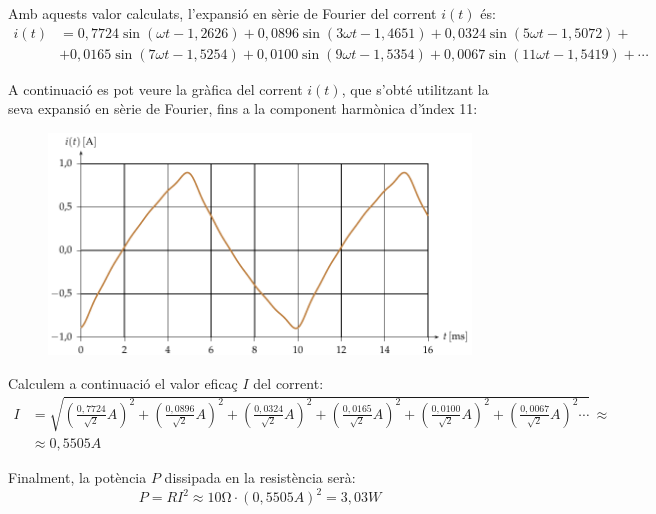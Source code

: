 \begin{exemple}
Amb aquests valor calculats, l'expansi\'{o} en s\`{e}rie de Fourier del
corrent $i(t)$ \'{e}s:
\[\begin{split}
     i(t) &=  0{,}7724 \sin(\omega t - 1{,}2626) +  0{,}0896 \sin(3 \omega t -
     1{,}4651) + 0{,}0324 \sin(5 \omega t - 1{,}5072) +{}\\
     &+ 0{,}0165 \sin(7 \omega t - 1{,}5254) + 0{,}0100 \sin(9 \omega t - 1{,}5354)
     +0{,}0067 \sin(11 \omega t - 1{,}5419) +\cdots
\end{split}\]

A continuaci\'{o} es pot veure la gr\`{a}fica del corrent $i(t)$, que s'obt\'{e}
utilitzant la seva expansi\'{o} en s\`{e}rie de Fourier, fins a la component
harm\`{o}nica d'\'{\i}ndex 11:

\begin{figure}[h]
\centering
  \includegraphics{Imatges/Cap-Fourier-Exemple-Corrent.pdf}
\end{figure}

Calculem a continuaci\'{o} el valor efica\c{c} $I$ del corrent:
\[\begin{split}
    I &= \sqrt{\left(\tfrac{0{,}7724}{\sqrt{2}}\unit{A}\right)^2 +
        \left(\tfrac{0{,}0896}{\sqrt{2}}\unit{A}\right)^2 +
        \left(\tfrac{0{,}0324}{\sqrt{2}}\unit{A}\right)^2 +
        \left(\tfrac{0{,}0165}{\sqrt{2}}\unit{A}\right)^2 +
        \left(\tfrac{0{,}0100}{\sqrt{2}}\unit{A}\right)^2 +
        \left(\tfrac{0{,}0067}{\sqrt{2}}\unit{A}\right)^2 \cdots}
        \,\approx \\[1ex]
        &\approx 0{,}5505\unit{A}
\end{split}\]

Finalment, la pot\`{e}ncia $P$ dissipada en la resist\`{e}ncia ser\`{a}:
\[
    P = R I^2 \approx 10\unit{\ohm} \cdot (0{,}5505\unit{A})^2 =
    3{,}03\unit{W}
\]


\end{exemple}
